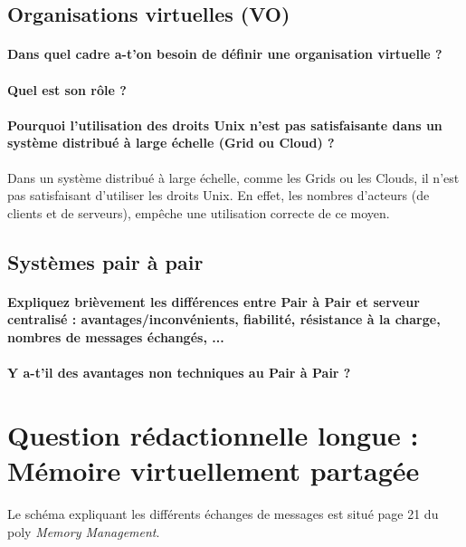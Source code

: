 \documentclass[a4paper]{article}
\begin{document}
\subsection{Organisations virtuelles (VO)}

\paragraph{Dans quel cadre a-t'on besoin de définir une organisation virtuelle ?}

\paragraph{Quel est son rôle ?}

\paragraph{Pourquoi l'utilisation des droits Unix n'est pas satisfaisante dans un système distribué à large échelle (Grid ou Cloud) ?}
Dans un système distribué à large échelle, comme les Grids ou les Clouds, il n'est pas satisfaisant d'utiliser les droits Unix. En effet, les nombres d'acteurs (de clients et de serveurs), empêche une utilisation correcte de ce moyen.

\subsection{Systèmes pair à pair}

\paragraph{Expliquez brièvement les différences entre Pair à Pair et serveur centralisé : avantages/inconvénients, fiabilité, résistance à la charge, nombres de messages échangés, ...}

\paragraph{Y a-t'il des avantages non techniques au Pair à Pair ?}

\section{Question rédactionnelle longue : Mémoire virtuellement partagée}

Le schéma expliquant les différents échanges de messages est situé page 21 du poly \textit{Memory Management}.
\end{document}
